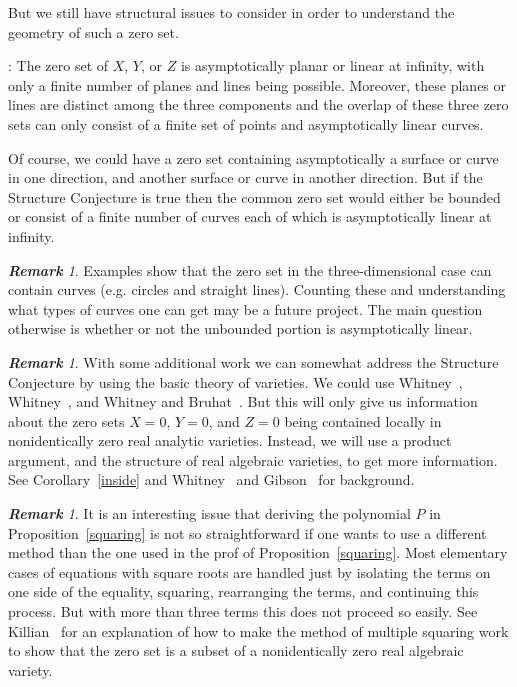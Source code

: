\documentclass{article}
\theoremstyle{remark}
\newtheorem{rem}[thm]{\bf Remark}
\numberwithin{equation}{section}
\begin{document}
But we still have structural issues to consider in order to understand the geometry of such a zero set.
\medskip

: The zero set of $X$, $Y$, or $Z$ is asymptotically planar or linear at infinity, with only a finite number of planes and lines 
being possible.  Moreover, these planes or lines are distinct among the three components and the overlap of these three zero sets can only consist of a 
finite set of points and asymptotically linear curves.
\medskip

Of course, we could have a zero set containing asymptotically a surface or curve in one direction, and another surface or curve in another direction.  
But if the Structure Conjecture is true then the common zero set would either be bounded or consist of a finite number of curves each of which is asymptotically 
linear at infinity.  

\begin{rem} Examples show that the zero set in the three-dimensional case can contain curves (e.g. circles and straight lines).  Counting these and understanding 
what types of curves one can get may be a future project.  The main question otherwise is whether or not the unbounded portion is asymptotically linear.  
\end{rem}

\begin{rem} With some additional work we can somewhat address the Structure Conjecture by using the basic theory of varieties.  
We could use Whitney~\cite{WI}, Whitney~\cite{WII}, and Whitney and Bruhat~\cite{WB}.  But this will only give us information about the zero sets $X=0$, $Y=0$, and $Z=0$ 
being contained locally in nonidentically zero real analytic varieties.
Instead, we will use a product argument, and the structure of real algebraic varieties, to get more information. See Corollary~\ref{inside} and Whitney~\cite{WI} and Gibson~\cite{Gibson} 
for background. 
\end{rem}

\begin{rem}  It is an interesting issue that deriving the polynomial $P$ in Proposition~\ref{squaring} is not so straightforward if one wants to use a different method than the one used
in the prof of Proposition~\ref{squaring}. Most elementary cases of equations with square roots are handled just by isolating the terms on one side of the equality, squaring, rearranging 
the terms, and continuing this process.  But with more than three terms this does not proceed so easily.  See Killian~\cite{K} for an explanation of how to make the method of multiple 
squaring work to show that the zero set is a subset of a nonidentically zero real algebraic variety.
\end{rem}
\end{document}
